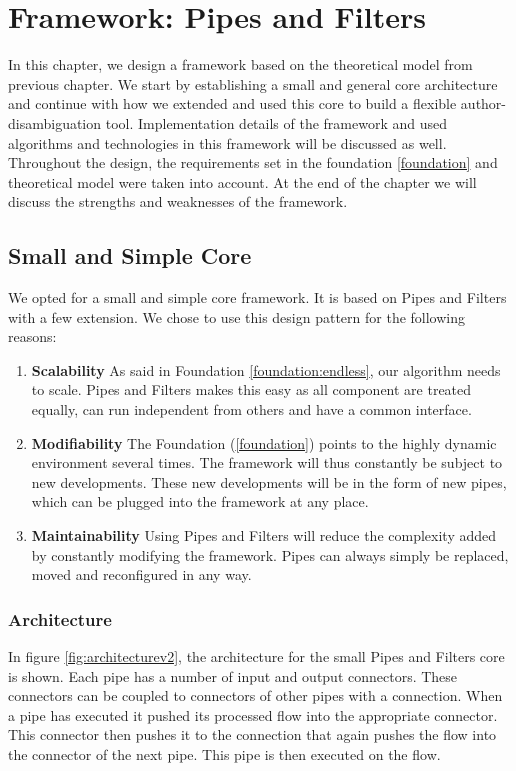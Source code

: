 \chapter{Framework: Pipes and Filters}
\label{newframework}

In this chapter, we design a framework based on the theoretical model from previous chapter. We start by establishing a small and general core architecture and continue with how we extended and used this core to build a flexible author-disambiguation tool. Implementation details of the framework and used algorithms and technologies in this framework will be discussed as well. Throughout the design, the requirements set in the foundation \autoref{foundation} and theoretical model were taken into account. At the end of the chapter we will discuss the strengths and weaknesses of the framework.

\section{Small and Simple Core}

We opted for a small and simple core framework. It is based on Pipes and Filters with a few extension. We chose to use this design pattern for the following reasons:

\begin{enumerate}
\item \textbf{Scalability} As said in Foundation \autoref{foundation:endless}, our algorithm needs to scale. Pipes and Filters makes this easy as all component are treated equally, can run independent from others and have a common interface.
\item \textbf{Modifiability} The Foundation (\autoref{foundation}) points to the highly dynamic environment several times. The framework will thus constantly be subject to new developments. These new developments will be in the form of new pipes, which can be plugged into the framework at any place.
\item \textbf{Maintainability} Using Pipes and Filters will reduce the complexity added by constantly modifying the framework. Pipes can always simply be replaced, moved and reconfigured in any way.
\end{enumerate}

\subsection{Architecture}

In figure \autoref{fig:architecturev2}, the architecture for the small Pipes and Filters core is shown. Each pipe has a number of input and output connectors. These connectors can be coupled to connectors of other pipes with a connection. When a pipe has executed it pushed its processed flow into the appropriate connector. This connector then pushes it to the connection that again pushes the flow into the connector of the next pipe. This pipe is then executed on the flow.

